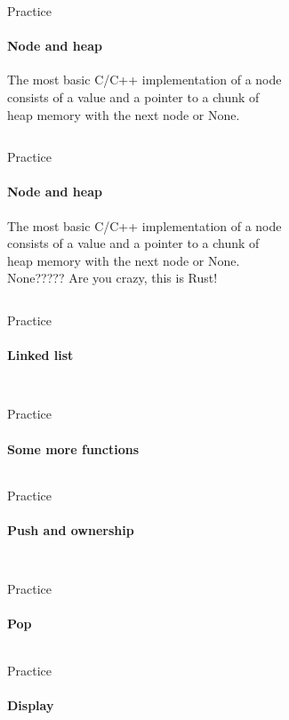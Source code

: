\documentclass[usenames,dvipsnames,10pt,aspectratio=169]{beamer}
\begin{document}
\begin{frame}{Practice}
\framesubtitle{Node and heap}
\large
The most basic C/C++ implementation of a node\\
consists of a value and a pointer to a chunk of\\
heap memory with the next node or None.
\vspace{0.2cm}
\inputminted[fontsize=\large]{rust}{code/list1.rs}
\end{frame}

\begin{frame}{Practice}
\framesubtitle{Node and heap}
\large
The most basic C/C++ implementation of a node\\
consists of a value and a pointer to a chunk of\\
heap memory with the next node or None.\\
\vspace{0.2cm}
\textcolor{ucuyellow}{None????? Are you crazy, this is Rust!}
\vspace{0.2cm}
\inputminted[fontsize=\large]{rust}{code/list2.rs}
\end{frame}

\begin{frame}{Practice}
\framesubtitle{Linked list}
\inputminted[fontsize=\footnotesize]{rust}{code/list3.rs}
\vspace{0.5cm}
\inputminted[fontsize=\footnotesize]{rust}{code/list4.rs}
\vspace{0.5cm}
\end{frame}

\begin{frame}{Practice}
\framesubtitle{Some more functions}
\inputminted[fontsize=\large]{rust}{code/list5.rs}
\end{frame}

\begin{frame}{Practice}
	\framesubtitle{Push and ownership}
\inputminted[fontsize=\normalsize]{rust}{code/list6.rs}
\vspace{0.5cm}
\inputminted[fontsize=\normalsize]{rust}{code/list7.rs}
\end{frame}

\begin{frame}{Practice}
	\framesubtitle{Pop}
\inputminted[fontsize=\large]{rust}{code/list8.rs}
\end{frame}

\begin{frame}{Practice}
	\framesubtitle{Display}
\inputminted[fontsize=\normalsize]{rust}{code/list9.rs}
\end{frame}
\end{document}
